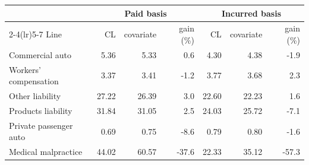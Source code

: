 \begin{tabular}{lrrrrrr}
\toprule
& \multicolumn{3}{c}{Paid basis} & \multicolumn{3}{c}{Incurred basis} \\
\cmidrule(lr){2-4}\cmidrule(lr){5-7}
Line & CL & covariate & gain (\%) & CL & covariate & gain (\%) \\
\midrule
Commercial auto & 5.36 & 5.33 & 0.6 & 4.30 & 4.38 & -1.9 \\
Workers' compensation & 3.37 & 3.41 & -1.2 & 3.77 & 3.68 & 2.3 \\
Other liability & 27.22 & 26.39 & 3.0 & 22.60 & 22.23 & 1.6 \\
Products liability & 31.84 & 31.05 & 2.5 & 24.03 & 25.72 & -7.1 \\
Private passenger auto & 0.69 & 0.75 & -8.6 & 0.79 & 0.80 & -1.6 \\
Medical malpractice & 44.02 & 60.57 & -37.6 & 22.33 & 35.12 & -57.3 \\
\bottomrule
\end{tabular}
